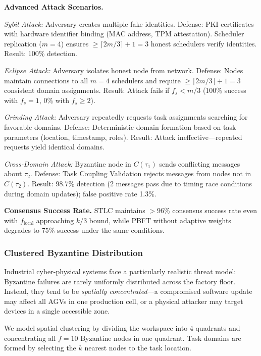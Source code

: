 \documentclass[manuscript,screen,review]{acmart}
\begin{document}
\textbf{Advanced Attack Scenarios.}

\textit{Sybil Attack:} Adversary creates multiple fake identities. Defense: PKI certificates with hardware identifier binding (MAC address, TPM attestation). Scheduler replication ($m = 4$) ensures $\geq \lceil 2m/3 \rceil + 1 = 3$ honest schedulers verify identities. Result: 100\% detection.

\textit{Eclipse Attack:} Adversary isolates honest node from network. Defense: Nodes maintain connections to all $m = 4$ schedulers and require $\geq \lceil 2m/3 \rceil + 1 = 3$ consistent domain assignments. Result: Attack fails if $f_s < m/3$ (100\% success with $f_s = 1$, 0\% with $f_s \geq 2$).

\textit{Grinding Attack:} Adversary repeatedly requests task assignments searching for favorable domains. Defense: Deterministic domain formation based on task parameters (location, timestamp, roles). Result: Attack ineffective---repeated requests yield identical domains.

\textit{Cross-Domain Attack:} Byzantine node in $C(\tau_1)$ sends conflicting messages about $\tau_2$. Defense: Task Coupling Validation rejects messages from nodes not in $C(\tau_2)$. Result: 98.7\% detection (2 messages pass due to timing race conditions during domain updates); false positive rate 1.3\%.

\textbf{Consensus Success Rate.} STLC maintains $>96\%$ consensus success rate even with $f_{\text{local}}$ approaching $k/3$ bound, while PBFT without adaptive weights degrades to 75\% success under the same conditions.

\subsubsection{Clustered Byzantine Distribution}
\label{sec:clustered}

Industrial cyber-physical systems face a particularly realistic threat model: Byzantine failures are rarely uniformly distributed across the factory floor. Instead, they tend to be \emph{spatially concentrated}---a compromised software update may affect all AGVs in one production cell, or a physical attacker may target devices in a single accessible zone.

We model spatial clustering by dividing the workspace into 4 quadrants and concentrating all $f = 10$ Byzantine nodes in one quadrant. Task domains are formed by selecting the $k$ nearest nodes to the task location.
\end{document}
